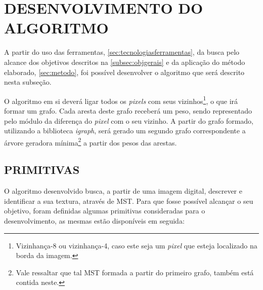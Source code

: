 
\section{DESENVOLVIMENTO DO ALGORITMO}
\label{sec:desenvolvimentoalgoritmo}

\par A partir do uso das ferramentas, \autoref{sec:tecnologiasferramentas}, da busca pelo alcance dos objetivos descritos na \autoref{subsec:objgerais} e da aplicação do método elaborado, \autoref{sec:metodo}, foi possível desenvolver o algoritmo que será descrito nesta subseção.

\par O algoritmo em si deverá ligar todos os \textit{pixels} com seus vizinhos\footnote{Vizinhança-8 ou vizinhança-4, caso este seja um \textit{pixel} que esteja localizado na borda da imagem.}, o que irá formar um grafo. Cada aresta deste grafo receberá um peso, sendo representado pelo módulo da diferença do \textit{pixel} com o seu vizinho. A partir do grafo formado, utilizando a biblioteca \textit{igraph}, será gerado um segundo grafo correspondente a árvore geradora mínima\footnote{Vale ressaltar que tal MST formada a partir do primeiro grafo, também está contida neste.} a partir dos pesos das arestas.

\subsection{PRIMITIVAS}
\label{subsec:primitivas}

\par O algoritmo desenvolvido busca, a partir de uma imagem digital, descrever e identificar a sua textura, através de MST. Para que fosse possível alcançar o seu objetivo, foram definidas algumas primitivas consideradas para o desenvolvimento, as mesmas estão disponíveis em seguida:

